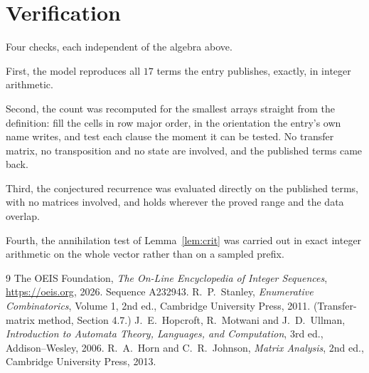 \documentclass[11pt,a4paper]{article}
\theoremstyle{plain}
\theoremstyle{definition}
\begin{document}
\section{Verification}

Four checks, each independent of the algebra above.

First, the model reproduces all $17$ terms the entry publishes, exactly, in integer
arithmetic.

Second, the count was recomputed for the smallest arrays straight from the definition: fill the
cells in row major order, in the orientation the entry's own name writes, and test each clause
the moment it can be tested. No transfer matrix, no transposition and no state are involved,
and the published terms came back.

Third, the conjectured recurrence was evaluated directly on the published terms, with no
matrices involved, and holds wherever the proved range and the data overlap.

Fourth, the annihilation test of Lemma~\ref{lem:crit} was carried out in exact integer
arithmetic on the whole vector rather than on a sampled prefix.

\begin{thebibliography}{9}
 The OEIS Foundation, \emph{The On-Line Encyclopedia of Integer
Sequences}, \url{https://oeis.org}, 2026. Sequence A232943.
 R.~P.~Stanley, \emph{Enumerative Combinatorics}, Volume 1, 2nd ed.,
Cambridge University Press, 2011. (Transfer-matrix method, Section 4.7.)
 J.~E.~Hopcroft, R.~Motwani and J.~D.~Ullman, \emph{Introduction to Automata
Theory, Languages, and Computation}, 3rd ed., Addison--Wesley, 2006.
 R.~A.~Horn and C.~R.~Johnson, \emph{Matrix Analysis}, 2nd ed., Cambridge
University Press, 2013.
\end{thebibliography}
\end{document}
